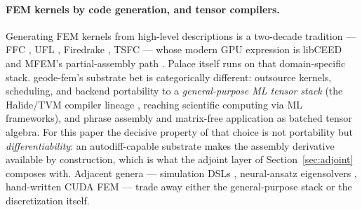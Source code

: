 \documentclass{anvil-paper}
\begin{document}
\paragraph{FEM kernels by code generation, and tensor compilers.}
Generating FEM kernels from high-level descriptions is a two-decade
tradition --- FFC \citep{kirby2006compiler}, UFL
\citep{alnaes2014unified}, Firedrake \citep{rathgeber2017firedrake}, TSFC
\citep{homolya2018tsfc} --- whose modern GPU expression is libCEED
\citep{brown2021libceed} and MFEM's partial-assembly path
\citep{andrej2024high}. Palace itself runs on that domain-specific stack.
geode-fem's substrate bet is categorically different: outsource kernels,
scheduling, and backend portability to a \emph{general-purpose ML tensor
stack} (the Halide/TVM compiler lineage
\citep{ragankelley2013halide,chen2018tvm}, reaching scientific computing
via ML frameworks), and phrase assembly and matrix-free application as
batched tensor algebra. For this paper the decisive property of that
choice is not portability but \emph{differentiability}: an
autodiff-capable substrate makes the assembly derivative available by
construction, which is what the adjoint layer of
Section~\ref{sec:adjoint} composes with. Adjacent genera --- simulation
DSLs \citep{hu2019difftaichi,holl2020learning}, neural-ansatz
eigensolvers \citep{jiang2024fieldtnn}, hand-written CUDA FEM
\citep{huantingmeng2014gpu} --- trade away either the general-purpose
stack or the discretization itself.
\end{document}
